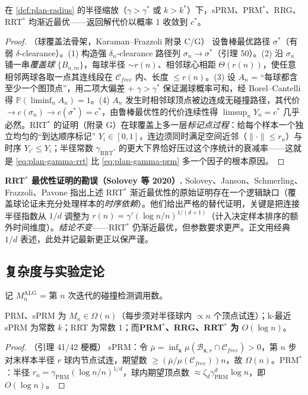 \begin{theorem}\label{thm:plan-ao-pos}
在 \cref{def:plan-radius} 的半径缩放（$\gamma>\gamma^*$ 或 $k>k^*$）下，sPRM、PRM$^*$、RRG、RRT$^*$ 均渐近最优——返回解代价以概率 1 收敛到 $c^*$。
\end{theorem}
\begin{proof}（球覆盖法骨架，Karaman--Frazzoli\cite{karaman2011sampling} 附录 C/G\rebuilt）
设鲁棒最优路径 $\sigma^*$（有弱 $\delta$-clearance）。(1) 构造强 $\delta_n$-clearance 路径列 $\sigma_n\to\sigma^*$（引理 50）。(2) 沿 $\sigma_n$ 铺一串\emph{覆盖球} $\{B_{n,m}\}$，每球半径 $\sim r(n)$、相邻球心相距 $\Theta(r(n))$，使任意相邻两球各取一点其连线段在 $\mathcal{C}_{free}$ 内、长度 $\le r(n)$。(3) 设 $A_n$ = “每球都含至少一个图顶点”，用二项大偏差 + $\gamma>\gamma^*$ 保证漏球概率可和，经 Borel--Cantelli 得 $\mathbb{P}(\liminf_n A_n)=1$。(4) $A_n$ 发生时相邻球顶点被边连成无碰撞路径，其代价 $\to c(\sigma_n)\to c(\sigma^*)=c^*$，由鲁棒最优性的代价连续性得 $\limsup_n Y_n=c^*$ 几乎必然。RRT$^*$ 的证明（附录 G）在球覆盖上多一层\emph{标记点过程}：给每个样本一个独立均匀的“到达顺序标记” $Y_i\in[0,1]$，连边须同时满足空间近邻（$\|\cdot\|\le r_n$）与时序 $Y_{i'}\le Y_i$；半径常数 $\gamma_{\mathrm{RRT}^*}$ 的更大下界恰好压过这个序统计的衰减率——这就是 \cref{eq:plan-gamma-rrt} 比 \cref{eq:plan-gamma-prm} 多一个因子的根本原因。
\end{proof}

\begin{note}
\textbf{RRT$^*$ 最优性证明的勘误（Solovey 等 2020）.}\;
Solovey、Janson、Schmerling、Frazzoli、Pavone\cite{solovey2020revisiting} 指出上述 RRT$^*$ 渐近最优性的原始证明存在一个逻辑缺口（覆盖球论证未充分处理样本的\emph{时序依赖}）。他们给出严格的替代证明，关键是把连接半径指数从 $1/d$ 调整为 $r(n)=\gamma'(\log n/n)^{1/(d+1)}$（计入决定样本排序的额外时间维度）。\emph{结论不变}——RRT$^*$ 仍渐近最优，但参数要求更严。正文用经典 $1/d$ 表述，此处并记最新更正以保严谨。
\end{note}

\subsection{复杂度与实验定论}
\label{sec:plan-complexity}

记 $M_n^{\mathrm{ALG}}$ = 第 $n$ 次迭代的碰撞检测调用数。

\begin{theorem}[每步碰撞检测复杂度]\label{thm:plan-complexity}
PRM、sPRM 为 $M_n\in\Omega(n)$（每步须对半径球内 $\propto n$ 个顶点试连）；k-最近 sPRM 为常数 $k$；RRT 为常数 1；而\textbf{PRM$^*$、RRG、RRT$^*$ 为 $O(\log n)$}。
\end{theorem}
\begin{proof}（引理 41/42 梗概）
sPRM：令 $\bar\mu=\inf_{\mathbf{x}}\mu(\mathcal{B}_{\mathbf{x},r}\cap\mathcal{C}_{free})>0$，第 $n$ 步对末样本半径 $r$ 球内节点试连，期望数 $\ge(\bar\mu/\mu(\mathcal{C}_{free}))n$，故 $\Omega(n)$。PRM$^*$：半径 $r_n=\gamma_{\mathrm{PRM}}(\log n/n)^{1/d}$，球内期望顶点数 $\approx\zeta_d\gamma_{\mathrm{PRM}}^d\log n$，即 $O(\log n)$。
\end{proof}

